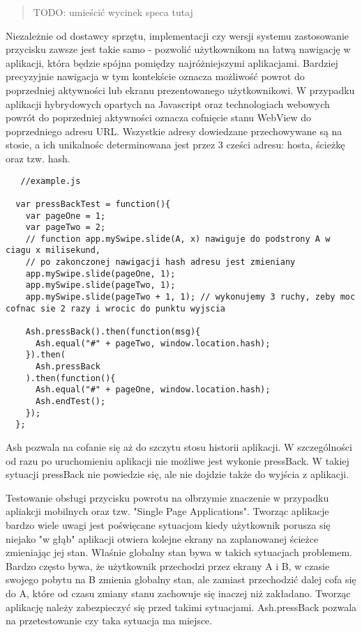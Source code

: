 \documentclass[brudnopis]{xmgr}
\begin{document}
\begin{quote}
{TODO: umieścić wycinek speca tutaj}
\end{quote}

Niezależnie od dostawcy sprzętu, implementacji czy wersji systemu zastosowanie przycisku zawsze jest takie samo - pozwolić użytkownikom na łatwą nawigację w aplikacji, która będzie spójna pomiędzy najróżniejszymi aplikacjami. Bardziej precyzyjnie nawigacja w tym kontekście  oznacza możliwość powrot do poprzedniej aktywności lub ekranu prezentowanego użytkownikowi. W przypadku aplikacji hybrydowych opartych na Javascript oraz technologiach webowych powrót do poprzedniej aktywności oznacza cofnięcie stanu WebView do poprzedniego adresu URL. Wszystkie adresy dowiedzane przechowywane są na stosie, a ich unikalnośc determinowana jest przez 3 cześci adresu: hosta, ścieżkę oraz tzw. hash. 

\begin{lstlisting}
   //example.js

  var pressBackTest = function(){
    var pageOne = 1;
    var pageTwo = 2;
    // function app.mySwipe.slide(A, x) nawiguje do podstrony A w ciagu x milisekund,
    // po zakonczonej nawigacji hash adresu jest zmieniany
    app.mySwipe.slide(pageOne, 1); 
    app.mySwipe.slide(pageTwo, 1); 
    app.mySwipe.slide(pageTwo + 1, 1); // wykonujemy 3 ruchy, zeby moc cofnac sie 2 razy i wrocic do punktu wyjscia
    
    Ash.pressBack().then(function(msg){
      Ash.equal("#" + pageTwo, window.location.hash);
    }).then(
      Ash.pressBack
    ).then(function(){
      Ash.equal("#" + pageOne, window.location.hash);
      Ash.endTest();
    });
  };
\end{lstlisting}

Ash pozwala na cofanie się aż do szczytu stosu historii aplikacji. W szczególności od razu po uruchomieniu aplikacji nie możliwe jest wykonie pressBack. W takiej sytuacji pressBack nie powiedzie się, ale nie dojdzie także do wyjścia z aplikacji.

Testowanie obsługi przycisku powrotu na olbrzymie znaczenie w przypadku apliakcji mobilnych  oraz tzw. "Single Page Applications". Tworząc aplikacje bardzo wiele uwagi jest poświęcane sytuacjom kiedy użytkownik porusza się niejako "w głąb" aplikacji otwiera kolejne ekrany na zaplanowanej ścieżce zmieniając jej stan.  Właśnie globalny stan bywa w takich sytuacjach problemem. Bardzo często bywa, że użytkownik przechodzi przez ekrany A i B, w czasie swojego pobytu na B zmienia globalny stan, ale zamiast przechodzić dalej cofa się do A, które od czasu zmiany stanu zachowuje się inaczej niż zakładano. Tworząc aplikację należy zabezpieczyć się przed takimi sytuacjami. Ash.pressBack pozwala na przetestowanie czy taka sytuacja ma miejsce. 
\end{document}
